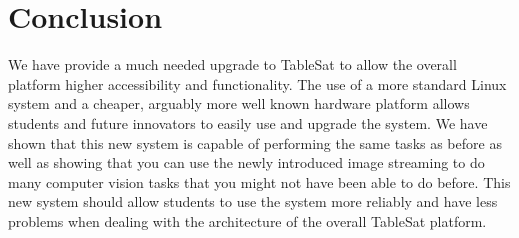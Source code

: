\documentclass[conference, onecolumn, 12pt]{IEEEtran}
\begin{document}
\section{Conclusion}
We have provide a much needed upgrade to TableSat to allow the overall platform higher accessibility and functionality. The use of a more standard Linux system and a cheaper, arguably more well known hardware platform allows students and future innovators to easily use and upgrade the system. We have shown that this new system is capable of performing the same tasks as before as well as showing that you can use the newly introduced image streaming to do many computer vision tasks that you might not have been able to do before. This new system should allow students to use the system more reliably and have less problems when dealing with the architecture of the overall TableSat platform.
\end{document}
